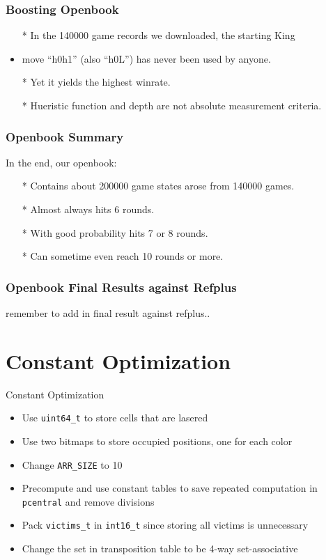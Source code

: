 \documentclass[10pt]{beamer}
\newcommand{\tred}[1]{\textcolor{dred}{#1}}
\newcommand{\itema}{\item[*]}
\begin{document}
	\begin{frame}
		\frametitle{Boosting Openbook}
		
		\begin{itemize}
		\item[*] In the 140000 game records we downloaded, the starting King
		\item move ``h0h1'' (also ``h0L'') has never been used by anyone.\pause
		\item[*] Yet it yields the highest winrate. \pause
		\item[*] Hueristic function and depth are not absolute measurement criteria.
		\end{itemize}
		
	\end{frame}
	
	\begin{frame}
		\frametitle{Openbook Summary}

		In the end, our openbook:
		\begin{itemize}
		\item[*] Contains about \textcolor{fgreen}{200000} game states arose from \textcolor{fgreen}{140000} games.
		\item[*] Almost always hits \textcolor{fgreen}{6} rounds.
		\item[*] With good probability hits \textcolor{fgreen}{7} or \textcolor{fgreen}{8} rounds.
		\item[*] Can sometime even reach \textcolor{fgreen}{10} rounds or more.
		\end{itemize}
	\end{frame}

	\begin{frame}
		\frametitle{Openbook Final Results against Refplus}

		\tred{remember to add in final result against refplus..}

	\end{frame}

	\section{Constant Optimization}
	\begin{frame}{Constant Optimization}
        \begin{itemize}
            \itema Use {\tt uint64\_t} to store cells that are lasered
            \itema Use two bitmaps to store occupied positions, one for each color
            \itema Change {\tt ARR\_SIZE} to 10
            \itema Precompute and use constant tables to save repeated computation in {\tt pcentral} and remove divisions
            \itema Pack {\tt victims\_t} in {\tt int16\_t} since storing all victims is unnecessary
            \itema Change the set in transposition table to be 4-way set-associative
        \end{itemize}
	\end{frame}
\end{document}
